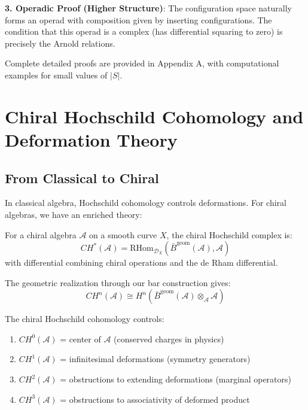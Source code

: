 \textbf{3. Operadic Proof (Higher Structure)}:
The configuration space naturally forms an operad with composition given by inserting configurations. The condition that this operad is a complex (has differential squaring to zero) is precisely the Arnold relations.

Complete detailed proofs are provided in Appendix A, with computational examples for small values of $|S|$.

\section{Chiral Hochschild Cohomology and Deformation Theory}

\subsection{From Classical to Chiral}

In classical algebra, Hochschild cohomology controls deformations. For chiral algebras, we have an enriched theory:

\begin{definition}
For a chiral algebra $\mathcal{A}$ on a smooth curve $X$, the chiral Hochschild complex is:
$$CH^*(\mathcal{A}) = \text{RHom}_{\mathcal{D}_X}(\bar{B}^{\text{geom}}(\mathcal{A}), \mathcal{A})$$
with differential combining chiral operations and the de Rham differential.
\end{definition}

The geometric realization through our bar construction gives:
$$CH^n(\mathcal{A}) \cong H^n\left(\bar{B}^{\text{geom}}(\mathcal{A}) \otimes_{\mathcal{A}} \mathcal{A}\right)$$

\begin{theorem}
The chiral Hochschild cohomology controls:
\begin{enumerate}
\item $CH^0(\mathcal{A})$ = center of $\mathcal{A}$ (conserved charges in physics)
\item $CH^1(\mathcal{A})$ = infinitesimal deformations (symmetry generators)
\item $CH^2(\mathcal{A})$ = obstructions to extending deformations (marginal operators)
\item $CH^3(\mathcal{A})$ = obstructions to associativity of deformed product
\end{enumerate}
\end{theorem}

